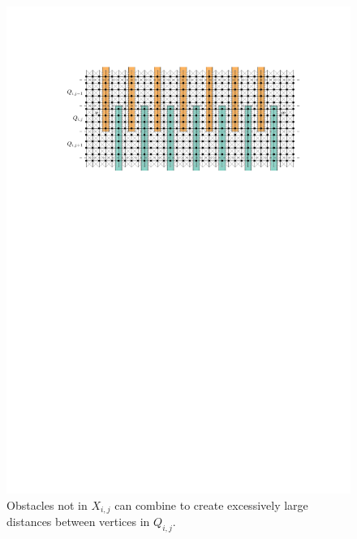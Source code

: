 \documentclass{patmorin}
\begin{document}
\begin{figure}
  \centering
  \includegraphics{figs/bad_combination}
  \caption{Obstacles not in $X_{i,j}$ can combine to create excessively large distances between vertices in $Q_{i,j}$.}
  \label{big_distance}
\end{figure}
\end{document}
